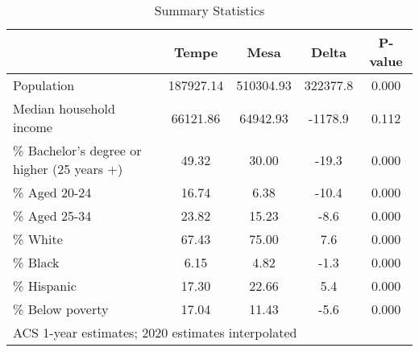 \begin{table}[htbp]\centering
\def\sym#1{\ifmmode^{#1}\else\(^{#1}\)\fi}
\caption{\centering Summary Statistics}
\begin{tabular}{l*{1}{cccc}}
\toprule
                &    Tempe&     Mesa&    Delta&  P-value\\
\midrule
Population      &187927.14&510304.93& 322377.8&    0.000\\
Median household income& 66121.86& 64942.93&  -1178.9&    0.112\\
\% Bachelor's degree or higher (25 years +)&    49.32&    30.00&    -19.3&    0.000\\
\% Aged 20-24   &    16.74&     6.38&    -10.4&    0.000\\
\% Aged 25-34   &    23.82&    15.23&     -8.6&    0.000\\
\% White        &    67.43&    75.00&      7.6&    0.000\\
\% Black        &     6.15&     4.82&     -1.3&    0.000\\
\% Hispanic     &    17.30&    22.66&      5.4&    0.000\\
\% Below poverty&    17.04&    11.43&     -5.6&    0.000\\
\bottomrule
\multicolumn{5}{l}{\footnotesize ACS 1-year estimates; 2020 estimates interpolated}\\
\end{tabular}
\end{table}
